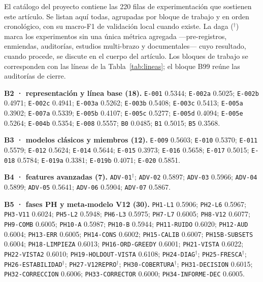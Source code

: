 \documentclass[journal]{IEEEtai}
\begin{document}
El cat\'alogo del proyecto contiene las 220 filas de experimentaci\'on que sostienen este art\'iculo.
Se listan aqu\'i todas, agrupadas por bloque de trabajo y en orden cronol\'ogico, con su macro-F1 de
validaci\'on local cuando existe. La daga ($^{\dagger}$) marca los experimentos sin una \'unica m\'etrica
agregada ---pre-registros, enmiendas, auditor\'ias, estudios multi-brazo y documentales--- cuyo
resultado, cuando procede, se discute en el cuerpo del art\'iculo. Los bloques de trabajo se corresponden con
las l\'ineas de la Tabla~\ref{tab:lineas}; el bloque B99 re\'une las auditor\'ias de cierre.

\par\medskip\noindent\textbf{B2 · representaci\'on y l\'inea base (18).} \texttt{E-001} 0.5344; \texttt{E-002a} 0.5025; \texttt{E-002b} 0.4971; \texttt{E-002c} 0.4941; \texttt{E-003a} 0.5262; \texttt{E-003b} 0.5408; \texttt{E-003c} 0.5413; \texttt{E-005a} 0.3902; \texttt{E-007a} 0.5339; \texttt{E-005b} 0.4107; \texttt{E-005c} 0.5277; \texttt{E-005d} 0.4094; \texttt{E-005e} 0.5264; \texttt{E-004b} 0.5354; \texttt{E-008} 0.5557; \texttt{B0} 0.0485; \texttt{B1} 0.5015; \texttt{B5} 0.3568.

\par\medskip\noindent\textbf{B3 · modelos cl\'asicos y miembros (12).} \texttt{E-009} 0.5603; \texttt{E-010} 0.5370; \texttt{E-011} 0.5579; \texttt{E-012} 0.5624; \texttt{E-014} 0.5644; \texttt{E-015} 0.3973; \texttt{E-016} 0.5658; \texttt{E-017} 0.5015; \texttt{E-018} 0.5784; \texttt{E-019a} 0.3381; \texttt{E-019b} 0.4071; \texttt{E-020} 0.5851.

\par\medskip\noindent\textbf{B4 · features avanzadas (7).} \texttt{ADV-01}$^{\dagger}$; \texttt{ADV-02} 0.5897; \texttt{ADV-03} 0.5966; \texttt{ADV-04} 0.5899; \texttt{ADV-05} 0.5641; \texttt{ADV-06} 0.5904; \texttt{ADV-07} 0.5867.

\par\medskip\noindent\textbf{B5 · fases PH y meta-modelo V12 (30).} \texttt{PH1-L1} 0.5906; \texttt{PH2-L6} 0.5967; \texttt{PH3-V11} 0.6024; \texttt{PH5-L2} 0.5948; \texttt{PH6-L3} 0.5975; \texttt{PH7-L7} 0.6005; \texttt{PH8-V12} 0.6077; \texttt{PH9-COMB} 0.6005; \texttt{PH10-A} 0.5987; \texttt{PH10-B} 0.5944; \texttt{PH11-RUIDO} 0.6020; \texttt{PH12-AUD} 0.6004; \texttt{PH13-ERR} 0.6005; \texttt{PH14-CONS} 0.6002; \texttt{PH15-CALIB} 0.6007; \texttt{PH15B-SUBSETS} 0.6004; \texttt{PH18-LIMPIEZA} 0.6013; \texttt{PH16-ORD-GREEDY} 0.6001; \texttt{PH21-VISTA} 0.6022; \texttt{PH22-VISTA2} 0.6010; \texttt{PH19-HOLDOUT-VISTA} 0.6108; \texttt{PH24-DIAG}$^{\dagger}$; \texttt{PH25-FRESCA}$^{\dagger}$; \texttt{PH26-ESTABILIDAD}$^{\dagger}$; \texttt{PH27-V12REPRO}$^{\dagger}$; \texttt{PH30-COBERTURA}$^{\dagger}$; \texttt{PH31-DECISION} 0.6015; \texttt{PH32-CORRECCION} 0.6006; \texttt{PH33-CORRECTOR} 0.6000; \texttt{PH34-INFORME-DEC} 0.6005.
\end{document}
